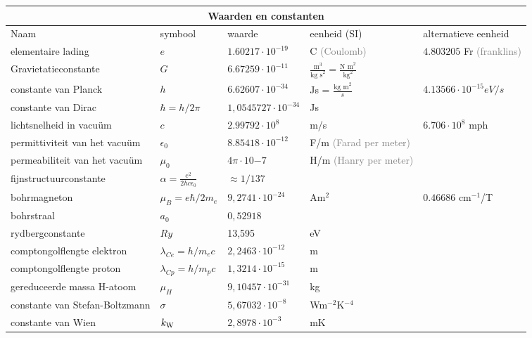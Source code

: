 \documentclass[dutch]{article}
\newcommand{\note}[1]{\textcolor{gray}{\tiny (#1)}}
\begin{document}
\centering
{
    \begin{tabular}{ l | l l l l}
        \hline
        \multicolumn{5}{c}{\huge{Waarden en constanten}} \\
        \hline
        Naam & symbool & waarde & eenheid (SI) & alternatieve eenheid \\
        \hline
        elementaire lading & $e$ & $1.60217\cdot 10^{-19}$ & C \note{Coulomb} & $4.803205$ Fr
        \note{franklins}\\
        Gravietatieconstante & $G$ & $6.67259\cdot 10^{-11}$ & $\frac{\text{m}^3}{\text{kg s}^2} =
        \frac{\text{N m}^2}{\text{kg}^2}$ & \\
        constante van Planck & $h$ & $6.62607\cdot 10^{-34}$ & Js = $\frac{\text{kg m}^2}{s}$ &
        $4.13566\cdot10^{-15}eV/s$ \\
        constante van Dirac & $\hbar=h/2\pi$ & $1,0545727\cdot10^{-34}$ & Js & \\
        lichtsnelheid in vacu\"um & $c$ & $2.99792\cdot10^8$ & m/s & $6.706\cdot10^8$ mph\\
        permittiviteit van het vacu\"um & $\epsilon_0$ & $8.85418\cdot10^{-12}$ & F/m
        \note{Farad per meter} & \\
        permeabiliteit van het vacu\"um & $\mu_0$ & $4\pi\cdot10{-7}$ & H/m \note{Hanry per meter} &
        \\
        fijnstructuurconstante & $\alpha = \frac{e^2}{2hc\epsilon_0}$ & $\approx 1/137$ & & \\ %
        bohrmagneton & $\mu_{B}=e\hbar/2m_{e}$ & $9,2741\cdot10^{-24}$ & Am$^2$ & $0.46686 \text{ cm}^{-1}$/T \\
        bohrstraal & $a_0$ & $0,52918$ & & \\
        rydbergconstante & $Ry$ & 13,595 & eV & \\
        comptongolflengte elektron & $\lambda_{Ce}=h/m_{e} c$ & $2,2463\cdot10^{-12}$
        & m & \\
        comptongolflengte proton & $\lambda_{Cp}=h/m_{p}c$ & $1,3214\cdot10^{-15}$
        & m & \\
        gereduceerde massa H-atoom & $\mu_{H}$ & $9,10457\cdot10^{-31}$ & kg & \\
        constante van Stefan-Boltzmann
        &$\sigma$ & $5,67032\cdot10^{-8}$ & Wm$^{-2}$K$^{-4}$ & \\
        constante van Wien & $k_{\rm W}$ & $2,8978\cdot10^{-3}$ & mK & \\
        \hline

\end{tabular}}
\end{document}
